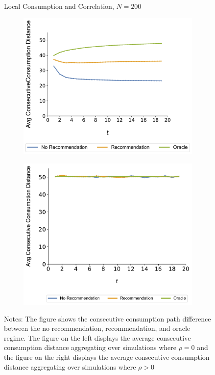 \documentclass[format=acmsmall, review=false]{acmart}
\begin{document}
\begin{figure}
\caption{Local Consumption and Correlation, $N = 200$}
\begin{subfigure}{.5\linewidth}
  \centering
  \includegraphics[width=.9\linewidth]{figures/rho_pos_consumption_dist_N_200T_20_overall.pdf}
  \label{fig:sfig1}
\end{subfigure}%
\begin{subfigure}{.5\linewidth}
  \centering
  \includegraphics[width=.9\linewidth]{figures/rho_zero_consumption_dist_N_200T_20_overall.pdf}
  \label{fig:sfig2}
\end{subfigure}
\caption*{\scriptsize Notes: The figure shows the consecutive consumption path difference between the no recommendation, recommendation, and oracle regime. The figure on the left displays the average consecutive consumption distance aggregating over simulations where $\rho = 0$ and the figure on the right displays the average consecutive consumption distance aggregating over simulations where $\rho > 0$}
\label{fig:correlation_consumption_path}
\end{figure}
\end{document}
